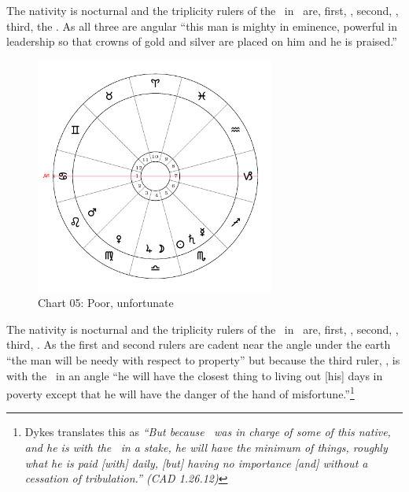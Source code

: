 The nativity is nocturnal and the triplicity rulers of the \Moon\, in \Scorpio\, are, first, \Mars, second, \Venus, third, the \Moon. As all three are angular ``this man is mighty in eminence, powerful in leadership so that crowns of gold and silver are placed on him and he is praised.''

\newpage
\begin{figure}[H]
\centering
\includegraphics[width=0.7\textwidth]{charts/1_24_05}
\vspace{-1em}
\caption{Chart 05: Poor, unfortunate}
\end{figure}

The nativity is nocturnal and the triplicity rulers of the \Moon\, in \Libra\, are, first, \Mercury, second, \Saturn, third, \Jupiter. As the first and second rulers are cadent near the angle under the earth ``the man will be needy with respect to property'' but because the third ruler, \Jupiter, is with the \Moon\, in an angle ``he will have the closest thing to living out [his] days in poverty except that he will have the danger of the hand of misfortune.''\footnote{Dykes translates this as \textsl{``But because \Jupiter\, was in charge of some of this native, and he is with the \Moon\, in a stake, he will have the minimum of things, roughly what he is paid [with] daily, [but] having no importance [and] without a cessation of tribulation.'' (CAD 1.26.12)}}

